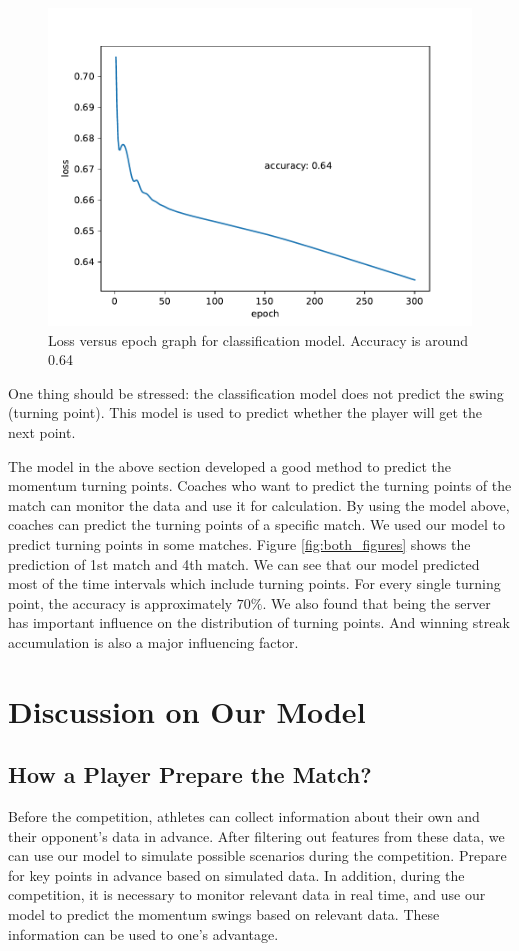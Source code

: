 \documentclass[UTF8]{mcmthesis}
\begin{document}
	\begin{figure}[H]
		\centering
		\includegraphics[width=1\linewidth]{figs/fig8.pdf}
		\caption{Loss versus epoch graph for classification model. Accuracy is around 0.64}
		\label{fig:fig8}
	\end{figure}
	
	One thing should be stressed: the classification model does not predict the swing (turning point). This model is used to predict whether the player will get the next point.
	
	The model in the above section developed a good method to predict the momentum turning points. Coaches who want to predict the turning points of the match can monitor the data and use it for calculation. By using the model above, coaches can predict the turning points of a specific match. We used our model to predict turning points in some matches. Figure \ref{fig:both_figures} shows the prediction of 1st match and 4th match. We can see that our model predicted most of the time intervals which include turning points. For every single turning point, the accuracy is approximately $70\%$. We also found that being the server has important influence on the distribution of turning points. And winning streak accumulation is also a major influencing factor.
            

    \section{Discussion on Our Model}
    
    \subsection{How a Player Prepare the Match?}
    Before the competition, athletes can collect information about their own and their opponent's data in advance. After filtering out features from these data, we can use our model to simulate possible scenarios during the competition. Prepare for key points in advance based on simulated data. In addition, during the competition, it is necessary to monitor relevant data in real time, and use our model to predict the momentum swings based on relevant data. These information can be used to one's advantage.
    
\end{document}
